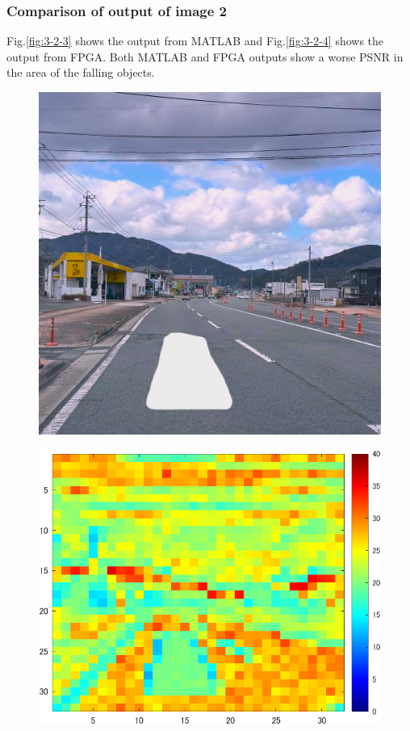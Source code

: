 \documentclass[conference]{IEEEtran}
\begin{document}
\subsubsection{Comparison of output of image 2 }%
Fig.\ref{fig:3-2-3} shows the output from MATLAB and Fig.\ref{fig:3-2-4} shows the output from FPGA.
Both MATLAB and FPGA outputs show a worse PSNR in the area of the falling objects.
\begin{figure}[tb]
  \begin{minipage}[t]{0.32\columnwidth}
    \centering
    \includegraphics[width=0.9\columnwidth]{figures/Ex_pr2.png}
    \label{fig:3-2-2}
  \end{minipage}
  \begin{minipage}[t]{0.32\linewidth}
    \centering
    \includegraphics[width=0.9\columnwidth]{figures/Ex_re3.png}

\end{minipage}
\end{figure}
\end{document}
